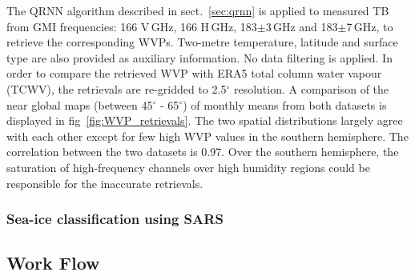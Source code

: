 \documentclass[12pt,oneside,a4paper]{article}
\begin{document}
The QRNN algorithm described in sect.~\ref{sec:qrnn} is applied to measured TB from GMI frequencies: 166 V\,GHz, 166 H\,GHz, 183$\pm$3\,GHz and 183$\pm$7\,GHz, to retrieve the corresponding WVPs. Two-metre temperature, latitude and surface type are also provided as auxiliary information. No data filtering is applied. In order to compare the retrieved WVP with ERA5 total column water vapour (TCWV), the retrievals are re-gridded to 2.5$^{\circ}$ resolution. A comparison of the near global maps (between 45$^\circ$ - 65$^\circ$) of monthly means from both datasets is displayed in fig~\ref{fig:WVP_retrievals}. The two spatial distributions largely agree with each other except for few high WVP values in the southern hemisphere. The correlation between the two datasets is 0.97. Over the southern hemisphere, the saturation of high-frequency channels over high humidity regions could be responsible for the inaccurate retrievals.

\subsubsection{Sea-ice classification using SARS}

\subsection{Work Flow}
\label{sec:wp}
\end{document}
